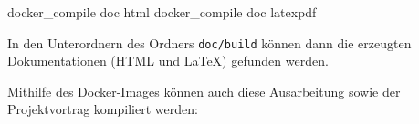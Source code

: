 \documentclass[oneside]{elaboration}
\begin{document}
\begin{bashcode}
    docker_compile doc html
    docker_compile doc latexpdf
\end{bashcode}








In den Unterordnern des Ordners \texttt{doc/build} können dann die erzeugten
Dokumentationen (HTML und LaTeX) gefunden werden.

Mithilfe des Docker-Images können auch diese Ausarbeitung sowie der
Projektvortrag kompiliert werden:
\end{document}
